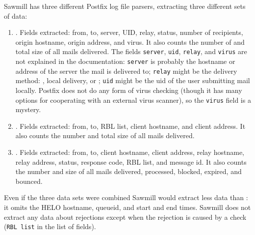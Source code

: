 Sawmill has three different Postfix log file parsers, extracting three
different sets of data:

\begin{enumerate}

    \item {}.
        Fields extracted: from, to, server, UID, relay, status, number of
        recipients, origin hostname, origin  address, and
        virus.  It also counts the number of and total size of all mails
        delivered.  The fields \texttt{server}, \texttt{uid},
        \texttt{relay}, and \texttt{virus} are not explained in the
        documentation: \texttt{server} is probably the hostname or
         address of the server the mail is delivered to;
        \texttt{relay} might be the delivery method: , local
        delivery, or ; \texttt{uid} might be the uid of the
        user submitting mail locally.  Postfix does not do any form of
        virus checking (though it has many options for cooperating with an
        external virus scanner), so the \texttt{virus} field is a mystery.

    \item {}.
        Fields extracted: from, to, RBL list, client hostname, and client
         address.  It also counts the number and total size of
        all mails delivered.  

    \item {}.
        Fields extracted: from, to, client hostname, client 
        address, relay hostname, relay  address, status,
        response code, RBL list, and message id.  It also counts the number
        and size of all mails delivered, processed, blocked, expired, and
        bounced.

\end{enumerate}

Even if the three data sets were combined Sawmill would extract less data
than \parsername{}: it omits the HELO hostname, queueid, and start and end
times.  Sawmill does not extract any data about rejections except when the
rejection is caused by a  check (\texttt{RBL list} in the
list of fields).

